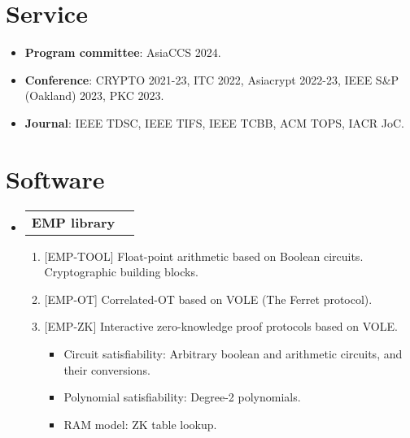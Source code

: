 \documentclass[letterpaper,11pt]{article}
\makeatletter
\newcommand{\resumeItem}[1]{
  \item\small{
    {#1 \vspace{-2pt}}
  }
}
\newcommand{\resumeDevHeading}[1]{
    \item
    \begin{tabular*}{0.97\textwidth}{l@{\extracolsep{\fill}}r}
        \textbf{#1} \\
    \end{tabular*}\vspace{-7pt}
}
\newcommand{\resumeItemListStart}{\begin{itemize}}
\newcommand{\resumeItemListEnd}{\end{itemize}\vspace{-5pt}}
\makeatother
\begin{document}
\section{Service}
\begin{itemize}[leftmargin=0.15in, label={}]
  \item \textbf{Program committee}: AsiaCCS 2024.
  \item \textbf{Conference}: CRYPTO 2021-23, ITC 2022, Asiacrypt 2022-23, IEEE S\&P (Oakland) 2023, PKC 2023.
    \item \textbf{Journal}: IEEE TDSC, IEEE TIFS, IEEE TCBB, ACM TOPS, IACR JoC.
\end{itemize}
%
\section{Software}
 \begin{itemize}[leftmargin=0.15in, label={}]
    \resumeDevHeading
      {\small EMP library}
		 \begin{enumerate}
             \item \small {[EMP-TOOL] Float-point arithmetic based on Boolean circuits. Cryptographic building blocks.}
			 \item \small {[EMP-OT] Correlated-OT based on VOLE (The Ferret protocol).}
			 \item \small {[EMP-ZK] Interactive zero-knowledge proof protocols based on VOLE.
         \begin{itemize}
          \item Circuit satisfiability: Arbitrary boolean and arithmetic circuits, and their conversions.
          \item Polynomial satisfiability: Degree-2 polynomials.
          \item RAM model: ZK table lookup.
         \end{itemize} }
		 \end{enumerate}
 \end{itemize}


\end{document}
